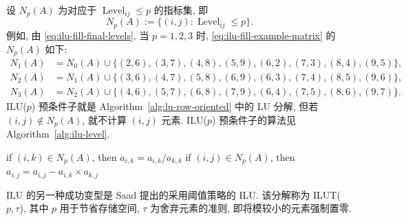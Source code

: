 {设 $N_p(A)$ 为对应于 $\operatorname{Level}_{ij}\le p$ 的指标集, 即}
\[N_p(A):=\{(i,j):\operatorname{Level}_{ij}\le p\}.\]
{例如, 由 \eqref{eq:ilu-fill-final-levels}, 当 $p=1,2,3$ 时, \eqref{eq:ilu-fill-example-matrix} 的 $N_p(A)$ 如下:}
\[\begin{aligned}
N_1(A)&=N_0(A)\cup\{(2,6),(3,7),(4,8),(5,9),(6,2),(7,3),(8,4),(9,5)\},\\
N_2(A)&=N_1(A)\cup\{(3,6),(4,7),(5,8),(6,9),(6,3),(7,4),(8,5),(9,6)\},\\
N_3(A)&=N_2(A)\cup\{(4,6),(5,7),(6,8),(7,9),(6,4),(7,5),(8,6),(9,7)\}.
\end{aligned}\]
{ILU($p$) 预条件子就是 Algorithm\ \ref{alg:lu-row-oriented} 中的 LU 分解, 但若 $(i,j)\notin N_p(A)$, 就不计算 $(i,j)$ 元素. ILU($p$) 预条件子的算法见 Algorithm\ \ref{alg:ilu-level}.}
\begin{algorithm}[H]\caption{{ILU($p$) 预条件子}}\label{alg:ilu-level}\begin{algorithmic}[1]
\State if $(i,k)\in N_p(A)$, then $a_{i,k}=a_{i,k}/a_{k,k}$
\State if $(i,j)\in N_p(A)$, then $a_{i,j}=a_{i,j}-a_{i,k}\times a_{k,j}$
\EndFor\EndFor\EndFor\end{algorithmic}\end{algorithm}
{\leavevmode{}\label{idx:chapter-03-section-05:ilut-threshold}ILU 的另一种成功变型是 Saad  提出的采用阈值策略的 ILU. 该分解称为 ILUT($p,\tau$), 其中 $p$ 用于节省存储空间, $\tau$ 为舍弃元素的准则, 即将模较小的元素强制置零.}
